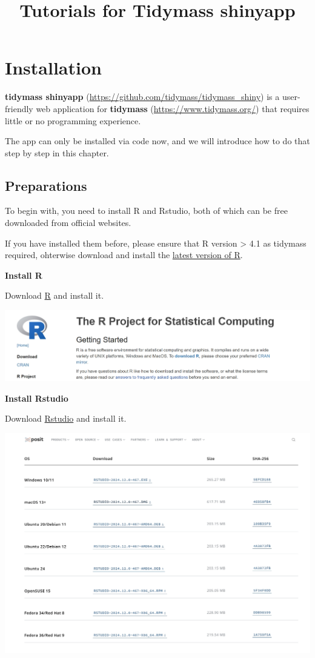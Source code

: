 \documentclass[
]{book}
\title{Tutorials for Tidymass shinyapp}
\author{}
\date{\vspace{-2.5em}}
\begin{document}
\maketitle

{
\setcounter{tocdepth}{1}
\tableofcontents
}
\chapter{Installation}\label{installation}

\textbf{tidymass shinyapp} (\url{https://github.com/tidymass/tidymass_shiny}) is a user-friendly web application for \textbf{tidymass} (\url{https://www.tidymass.org/}) that requires little or no programming experience.

The app can only be installed via code now, and we will introduce how to do that step by step in this chapter.

\section{Preparations}\label{preparations}

To begin with, you need to install R and Rstudio, both of which can be free downloaded from official websites.

If you have installed them before, please ensure that R version \textgreater{} 4.1 as tidymass required, ohterwise download and install the \href{https://cran.r-project.org/mirrors.html}{latest version of R}.

\textbf{Install R}

Download \href{https://www.r-project.org/}{R} and install it.

\includegraphics{figures/R_install.png}

\textbf{Install Rstudio}

Download \href{https://posit.co/download/rstudio-desktop/\#download}{Rstudio} and install it.

\includegraphics{figures/Rstudio_install.png}
\end{document}
